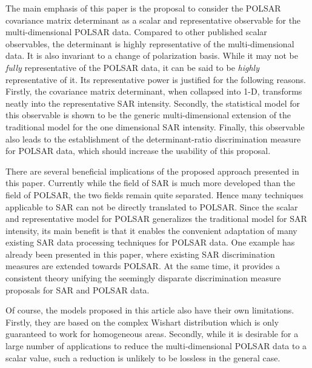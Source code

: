 \documentclass[]{tRSL2e}
\begin{document}
The main emphasis of this paper is the proposal to consider the POLSAR covariance matrix determinant as a scalar and representative observable for the multi-dimensional POLSAR data.
Compared to other published scalar observables, the determinant is highly representative of the multi-dimensional data.
It is also invariant to a change of polarization basis.
While it may not be \textit{fully} representative of the POLSAR data, it can be said to be \textit{highly} representative of it.
Its representative power is justified for the following reasons.
Firstly, the covariance matrix determinant, when collapsed into 1-D, transforms neatly into the representative SAR intensity.
Secondly, the statistical model for this observable is shown to be the generic multi-dimensional extension of the traditional model for the one dimensional SAR intensity.
Finally, this observable also leads to the establishment of the determinant-ratio discrimination measure for POLSAR data, which should increase the usability of this proposal.

There are several beneficial implications of the proposed approach presented in this paper.
Currently while the field of SAR is much more developed than the field of POLSAR,  the two fields remain  quite separated.
Hence many techniques applicable to SAR can not be directly translated to POLSAR.
Since the scalar and representative model for POLSAR generalizes the traditional model for SAR intensity,
  its main benefit is that it enables the convenient adaptation of many existing SAR data processing techniques for POLSAR data.
One example has already been presented in this paper, 
  where existing SAR discrimination measures are extended towards POLSAR.
At the same time, it provides a consistent theory unifying the seemingly disparate discrimination measure proposals for SAR and POLSAR data.  

Of course, the models proposed in this article also have their own limitations.
Firstly, they are based on the complex Wishart distribution
  which is only guaranteed to work for homogeneous areas.
Secondly, while it is desirable for a large number of applications to reduce the multi-dimensional POLSAR data to a scalar value, such a reduction is unlikely to be lossless in the general case.
\end{document}
